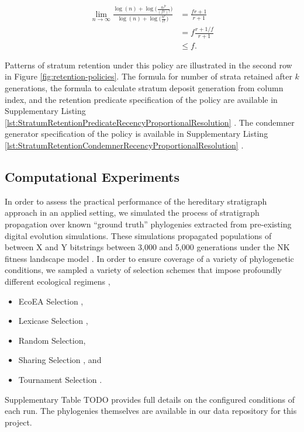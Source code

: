 \begin{align*}
\lim_{n \to \infty}
\frac{
  \log(n) + \log\Big(\frac{n^{fr}}{(fr)!}\Big)
}{
  \log(n) + \log\Big(\frac{n^r}{r!}\Big)
}
&= \frac{fr+1}{r+1}\\
&= f\frac{r + 1/f}{r + 1}\\
&\leq f.
\end{align*}

Patterns of stratum retention under this policy are illustrated in the second row in Figure \ref{fig:retention-policies}.
The formula for number of strata retained after $k$ generations, the formula to calculate stratum deposit generation from column index, and the retention predicate specification of the policy are available in Supplementary Listing \ref{lst:StratumRetentionPredicateRecencyProportionalResolution} \citep{moreno2022hstratconceptsupplement}.
The condemner generator specification of the policy is available in Supplementary Listing \ref{lst:StratumRetentionCondemnerRecencyProportionalResolution} \citep{moreno2022hstratconceptsupplement}.


\subsection{Computational Experiments}

In order to assess the practical performance of the hereditary stratigraph approach in an applied setting, we simulated the process of stratigraph propagation over known ``ground truth'' phylogenies extracted from pre-existing digital evolution simulations.
These simulations propagated populations of between X and Y bitstrings between 3,000 and 5,000 generations under the NK fitness landscape model \citep{kauffman1989nk}.
In order to ensure coverage of a variety of phylogenetic conditions, we sampled a variety of selection schemes that impose profoundly different ecological regimens \citep{dolson2018ecological},
\begin{itemize}
  \item EcoEA Selection \citep{goings2012ecology},
  \item Lexicase Selection \citep{helmuth2014solving},
  \item Random Selection,
  \item Sharing Selection \citep{goldberg1987genetic}, and
  \item Tournament Selection \citep{miller1995genetic}.
\end{itemize}

Supplementary Table TODO provides full details on the configured conditions of each run.
The phylogenies themselves are available in our data repository for this project.

